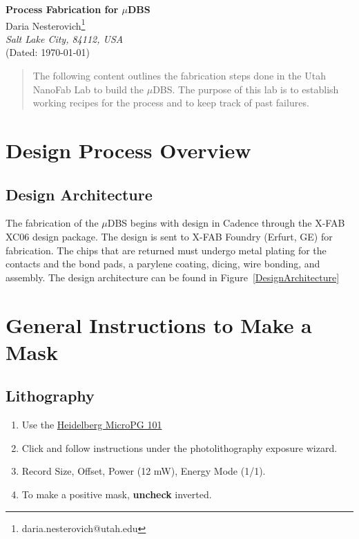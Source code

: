 \documentclass[12pt]{article}
\numberwithin{equation}{section}
\numberwithin{table}{section}
\numberwithin{figure}{section}
\begin{document}

\thispagestyle{fancy}

\begin{center}
\textbf{\Large Process Fabrication for $\mu$DBS} \\[20pt]
  Daria Nesterovich\footnote{daria.nesterovich@utah.edu}\\[2pt] \emph{Salt Lake City, 84112, USA}  \\[6pt]
  (Dated: \today)
\end{center}

\vspace{6pt}


\begin{abstract}
The following content outlines the fabrication steps done in the Utah NanoFab Lab to build the $\mu$DBS. The purpose of this lab is to establish working recipes for the process and to keep track of past failures.
\end{abstract}

\section{Design Process Overview}

\subsection{Design Architecture}

The fabrication of the $\mu$DBS begins with design in Cadence through the X-FAB XC06 design package. The design is sent to X-FAB Foundry (Erfurt, GE) for fabrication. The chips that are returned must undergo metal plating for the contacts and the bond pads, a parylene coating, dicing, wire bonding, and assembly. The design architecture can be found in Figure~\ref{DesignArchitecture}

\section{General Instructions to Make a Mask}

\subsection{Lithography}
\begin{enumerate}
\item Use the \href{https://coral.nanofab.utah.edu/lab/equipment/show_eq/Heidelberg+MicroPG+101/}{Heidelberg MicroPG 101}
\item Click and follow instructions under the photolithography exposure wizard.
\item Record Size, Offset, Power (12 mW), Energy Mode (1/1). 
\item To make a positive mask, {\bf uncheck} inverted.
\end{enumerate}
\end{document}
